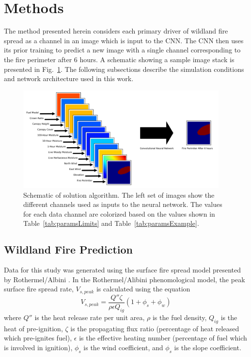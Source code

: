 \documentclass[twocolumn]{svjour3}          %
\begin{document}
\section{Methods}
\label{s:Methods}

The method presented herein considers each primary driver of wildland
fire spread as a channel in an image which is input to the CNN. The CNN
then uses its prior training to predict a new image with a single channel
corresponding to the fire perimeter after 6 hours. A schematic showing
a sample image stack is presented in Fig.~\ref{fig:exampleIO}. The following
subsections describe the simulation conditions and network architecture
used in this work.

\begin{figure}[htb]
  \includegraphics[width=0.95\textwidth]{inputsExampleSingleFire.png}
\caption{Schematic of solution algorithm. The left set of images show the
different channels used as inputs to the neural network. The values for each
data channel are colorized based on the values shown in
Table~\ref{tab:paramsLimits} and Table~\ref{tab:paramsExample}.}
\label{fig:exampleIO}       %
\end{figure}



\subsection{Wildland Fire Prediction}
\label{ss:Wfp}

Data for this study was generated using the surface fire spread model
presented by Rothermel/Albini
\cite{rothermel1972mathematical,scott2005standard,albini1976estimating}.
In the Rothermel/Alibini phenomological model, the peak surface fire
spread rate, $V_{s,peak}$ is calculated using the equation
\begin{equation}
V_{s,peak} = \frac{Q''\zeta}{\rho\epsilon Q_{ig}}\left(1+\phi_{s}+\phi_{w}\right)
\label{eq:rothermel}
\end{equation}
where $Q''$ is the heat release rate per unit area, $\rho$ is the
fuel density, $Q_{ig}$ is the heat of pre-ignition, $\zeta$ is the
propagating flux ratio (percentage of heat released which pre-ignites
fuel), $\epsilon$ is the effective heating number (percentage of fuel
which is involved in ignition), $\phi_{s}$ is the wind coefficient,
and $\phi_{s}$ is the slope coefficient.
\end{document}
